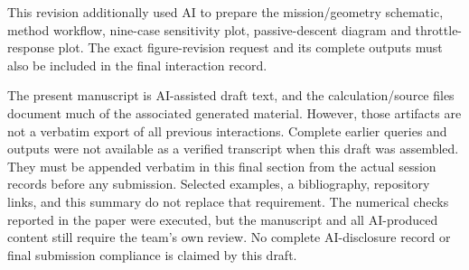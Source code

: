 \documentclass[
  11pt,
  a4paper,
]{article}
\begin{document}
This revision additionally used AI to prepare the mission/geometry
schematic, method workflow, nine-case sensitivity plot, passive-descent
diagram and throttle-response plot. The exact figure-revision request
and its complete outputs must also be included in the final interaction
record.

The present manuscript is AI-assisted draft text, and the
calculation/source files document much of the associated generated
material. However, those artifacts are not a verbatim export of all
previous interactions. Complete earlier queries and outputs were not
available as a verified transcript when this draft was assembled. They
must be appended verbatim in this final section from the actual session
records before any submission. Selected examples, a bibliography,
repository links, and this summary do not replace that requirement. The
numerical checks reported in the paper were executed, but the manuscript
and all AI-produced content still require the team's own review. No
complete AI-disclosure record or final submission compliance is claimed
by this draft.
\end{document}
